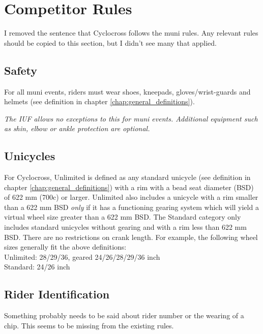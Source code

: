 \chapter{Competitor Rules}

\begin{framed}
I removed the sentence that Cyclocross follows the muni rules. Any relevant rules should be copied to this section, but I didn't see many that applied.
\end{framed}

\section{Safety}
For all muni events, riders must wear shoes, kneepads, gloves/wrist-guards and helmets (see definition in chapter \ref{chap:general_definitions}).

\textit{The IUF allows no exceptions to this for muni events. Additional equipment such as shin, elbow or ankle protection are optional.}

\section{Unicycles}

For Cyclocross, Unlimited is defined as any standard unicycle (see definition in chapter \ref{chap:general_definitions}) with a rim with a bead seat diameter (BSD) of 622 mm (700c) or larger.
Unlimited also includes a unicycle with a rim smaller than a 622 mm BSD {\em only} if it has a functioning gearing system which will yield a virtual wheel size greater than a 622 mm BSD.
The Standard category only includes standard unicycles without gearing and with a rim less than 622 mm BSD.
There are no restrictions on crank length.
For example, the following wheel sizes generally fit the above definitions: \\
Unlimited: 28/29/36, geared 24/26/28/29/36 inch \\
Standard: 24/26 inch

\section{Rider Identification}

\begin{framed}
Something probably needs to be said about rider number or the wearing of a chip.  This seems to be missing from the existing rules.
\end{framed}

